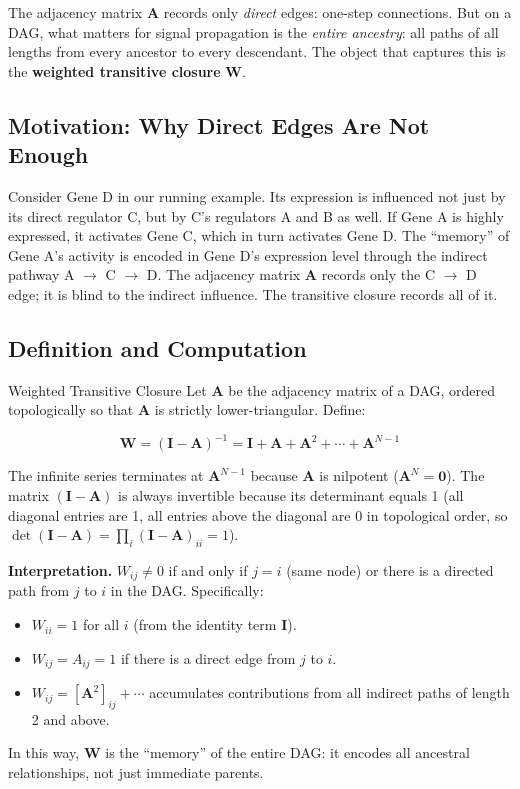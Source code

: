 The adjacency matrix $\mathbf{A}$ records only \emph{direct} edges: one-step
connections. But on a DAG, what matters for signal propagation is the
\emph{entire ancestry}: all paths of all lengths from every ancestor to every
descendant. The object that captures this is the \textbf{weighted transitive
closure} $\mathbf{W}$.

\subsection{Motivation: Why Direct Edges Are Not Enough}

Consider Gene D in our running example. Its expression is influenced not just
by its direct regulator C, but by C's regulators A and B as well. If Gene A is
highly expressed, it activates Gene C, which in turn activates Gene D. The
``memory'' of Gene A's activity is encoded in Gene D's expression level through
the indirect pathway A $\to$ C $\to$ D. The adjacency matrix $\mathbf{A}$
records only the C $\to$ D edge; it is blind to the indirect influence. The
transitive closure records all of it.

\subsection{Definition and Computation}

\begin{mathbox}{Weighted Transitive Closure}
Let $\mathbf{A}$ be the adjacency matrix of a DAG, ordered topologically so
that $\mathbf{A}$ is strictly lower-triangular. Define:

\begin{equation}
    \mathbf{W} = (\mathbf{I} - \mathbf{A})^{-1}
    = \mathbf{I} + \mathbf{A} + \mathbf{A}^2 + \cdots + \mathbf{A}^{N-1}
    \label{eq:transitive_closure}
\end{equation}

The infinite series terminates at $\mathbf{A}^{N-1}$ because $\mathbf{A}$ is
nilpotent ($\mathbf{A}^N = \mathbf{0}$). The matrix $(\mathbf{I} - \mathbf{A})$
is always invertible because its determinant equals 1 (all diagonal entries are
1, all entries above the diagonal are 0 in topological order, so
$\det(\mathbf{I} - \mathbf{A}) = \prod_i (\mathbf{I} - \mathbf{A})_{ii} = 1$).

\medskip
\textbf{Interpretation.}
$W_{ij} \neq 0$ if and only if $j = i$ (same node) or there is a directed
path from $j$ to $i$ in the DAG. Specifically:
\begin{itemize}[noitemsep]
    \item $W_{ii} = 1$ for all $i$ (from the identity term $\mathbf{I}$).
    \item $W_{ij} = A_{ij} = 1$ if there is a direct edge from $j$ to $i$.
    \item $W_{ij} = [\mathbf{A}^2]_{ij} + \cdots$ accumulates contributions
          from all indirect paths of length 2 and above.
\end{itemize}
In this way, $\mathbf{W}$ is the ``memory'' of the entire DAG: it encodes
all ancestral relationships, not just immediate parents.
\end{mathbox}

